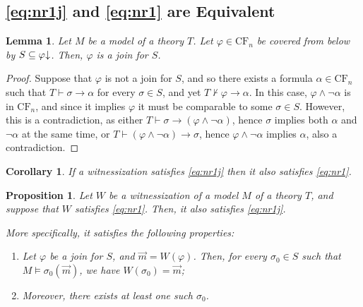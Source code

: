 \documentclass{article}
\newtheorem{prop}[theorem]{Proposition}
\newtheorem{lemma}[theorem]{Lemma}
\newtheorem{corollary}[theorem]{Corollary}
\theoremstyle{nonumberplain}
\newtheorem{proof}{Proof}
\newcommand{\CF}{\mathrm{CF}}
\newcommand{\dncl}[1]{{#1}\hspace{-0.25em}\downarrow}
\begin{document}
\subsection{\eqref{eq:nr1j} and \eqref{eq:nr1} are Equivalent}\label{sec:nr1jeqvnr1}

\begin{lemma}\label{lemma:coverbelow}
Let $M$ be a model of a theory $T$. Let $\varphi \in \CF_n$ be covered from below by $S \subseteq \dncl\varphi$. Then, $\varphi$ is a join for $S$.
\end{lemma}

\begin{proof}
Suppose that $\varphi$ is not a join for $S$, and so there exists a formula $\alpha \in \CF_n$ such that $T \vdash \sigma \rightarrow \alpha$ for every $\sigma \in S$, and yet $T \nvdash \varphi \rightarrow \alpha$. In this case, $\varphi \land \neg \alpha$ is in $\CF_n$, and since it implies $\varphi$ it must be comparable to some $\sigma \in S$. However, this is a contradiction, as either $T \vdash \sigma \rightarrow (\varphi \land \neg \alpha)$, hence $\sigma$ implies both $\alpha$ and $\neg \alpha$ at the same time, or $T \vdash (\varphi \land \neg \alpha) \rightarrow \sigma$, hence $\varphi \land \neg\alpha$ implies $\alpha$, also a contradiction.
\end{proof}

\begin{corollary}
If a witnessization satisfies \eqref{eq:nr1j} then it also satisfies \eqref{eq:nr1}.
\end{corollary}

\begin{prop}
Let $W$ be a witnessization of a model $M$ of a theory $T$, and suppose that $W$ satisfies \eqref{eq:nr1}. Then, it also satisfies \eqref{eq:nr1j}.

More specifically, it satisfies the following properties:
\begin{enumerate}
\item\label{item:join1} Let $\varphi$ be a join for $S$, and $\vec m = W(\varphi)$. Then, for every $\sigma_0 \in S$ such that $M \vDash \sigma_0(\vec m)$, we have $W(\sigma_0) = \vec m$;
\item\label{item:join2} Moreover, there exists at least one such $\sigma_0$.
\end{enumerate}
\end{prop}
\end{document}
